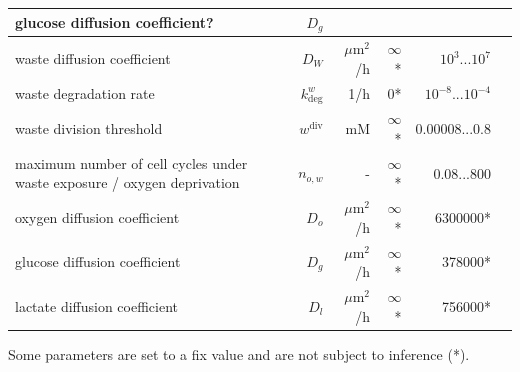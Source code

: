 \documentclass[10pt,letterpaper]{article}
\begin{document}
\begin{table}[!ht]
\begin{adjustwidth}{-0.5in}{0in}
\begin{tabular}{|p{6cm}|r|r|r|r|r|}
{\color{green}glucose diffusion coefficient?} 			&$D_g$&  &  &  \\ \hline
waste diffusion coefficient 			&$D_W$& $\mu$m$^{2}$/h&$\infty$*& $10^{3}...10^{7}$\\ \hline
waste degradation rate					& $k^w_{\text{deg}}$ &1/h &$0$*& $10^{-8}...10^{-4}$\\ \hline
waste division threshold 			&$w^{\text{div}}$ &{\color{green}mM} &$\infty$*&0.00008...0.8\\ \hline
maximum number of cell cycles under waste exposure / oxygen deprivation  	&$n_{o,w}$&-& $\infty$*& 0.08...800\\ \hline
\hline
oxygen diffusion coefficient		&$D_o$&  $\mu$m$^{2}$/h&  $\infty$*& 6300000* \\ \hline
glucose diffusion coefficient		&$D_g$&  $\mu$m$^{2}$/h&  $\infty$*&  378000*\\ \hline
lactate diffusion coefficient		&$D_l$&  $\mu$m$^{2}$/h&  $\infty$*&  756000*\\ \hline
\end{tabular}
Some parameters are set to a fix value and are not subject to inference (*).
\label{tab:model-parameters}
\end{adjustwidth}
\end{table}
\end{document}
